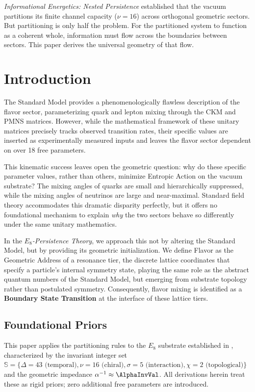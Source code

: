 
\textit{Informational Energetics: Nested Persistence} established that the vacuum partitions its finite channel capacity ($\nu=16$) across orthogonal geometric sectors. But partitioning is only half the problem. For the partitioned system to function as a coherent whole, information must flow across the boundaries between sectors. This paper derives the universal geometry of that flow.


\section{Introduction}
The Standard Model provides a phenomenologically flawless description of the flavor sector, parameterizing quark and lepton mixing through the CKM and PMNS matrices. However, while the mathematical framework of these unitary matrices precisely tracks observed transition rates, their specific values are inserted as experimentally measured inputs and leaves the flavor sector dependent on over 18 free parameters.

This kinematic success leaves open the geometric question: why do these specific parameter values, rather than others, minimize Entropic Action on the vacuum substrate? The mixing angles of quarks are small and hierarchically suppressed, while the mixing angles of neutrinos are large and near-maximal. Standard field theory accommodates this dramatic disparity perfectly, but it offers no foundational mechanism to explain \textit{why} the two sectors behave so differently under the same unitary mathematics.

In the \textit{$E_8$-Persistence Theory}, we approach this not by altering the Standard Model, but by providing its geometric initialization. We define Flavor as the Geometric Address of a resonance tier, the discrete lattice coordinates that specify a particle's internal symmetry state, playing the same role as the abstract quantum numbers of the Standard Model, but emerging from substrate topology rather than postulated symmetry. Consequently, flavor mixing is identified as a \textbf{Boundary State Transition} at the interface of these lattice tiers.

\subsection{Foundational Priors}
This paper applies the partitioning rules to the $E_8$ substrate established in \cite{meyer_informational_2026, meyer_ieaction_2026}, characterized by the invariant integer set $\mathbb{S}=\{\Delta=43\text{ (temporal)}, \nu=16\text{ (chiral)}, \sigma=5\text{ (interaction)}, \chi=2\text{ (topological)}\}$ and the geometric impedance $\alpha^{-1}\approx \AlphaInvVal$. All derivations herein treat these as rigid priors; zero additional free parameters are introduced.

